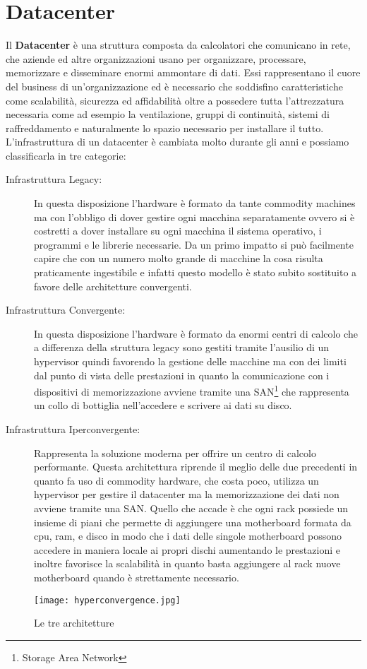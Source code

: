 \section{Datacenter}
Il \textbf{Datacenter} è una struttura composta da calcolatori che comunicano in rete, che aziende ed altre organizzazioni usano per organizzare, processare, memorizzare e disseminare enormi ammontare di dati. Essi rappresentano il cuore del business di un'organizzazione ed è necessario che soddisfino caratteristiche come scalabilità, sicurezza ed affidabilità oltre a possedere tutta l'attrezzatura necessaria come ad esempio la ventilazione, gruppi di continuità, sistemi di raffreddamento e naturalmente lo spazio necessario per installare il tutto. L'infrastruttura di un datacenter è cambiata molto durante gli anni e possiamo classificarla in tre categorie: 
\begin{description}
  \item[Infrastruttura Legacy:] In questa disposizione l'hardware è formato da tante commodity machines ma con l'obbligo di dover gestire ogni macchina separatamente ovvero si è costretti a dover installare su ogni macchina il sistema operativo, i programmi e le librerie necessarie. Da un primo impatto si può facilmente capire che con un numero molto grande di macchine la cosa risulta praticamente ingestibile e infatti questo modello è stato subito sostituito a favore delle architetture convergenti.
  \item[Infrastruttura Convergente:] In questa disposizione l'hardware è formato da enormi centri di calcolo che a differenza della struttura legacy sono gestiti tramite l'ausilio di un hypervisor quindi favorendo la gestione delle macchine ma con dei limiti dal punto di vista delle prestazioni in quanto la comunicazione con i dispositivi di memorizzazione avviene tramite una SAN\footnote{Storage Area Network} che rappresenta un collo di bottiglia nell'accedere e scrivere ai dati su disco.
  \item[Infrastruttura Iperconvergente:] Rappresenta la soluzione moderna per offrire un centro di calcolo performante. Questa architettura riprende il meglio delle due precedenti in quanto fa uso di commodity hardware, che costa poco, utilizza un hypervisor per gestire il datacenter ma la memorizzazione dei dati non avviene tramite una SAN. Quello che accade è che ogni rack possiede un insieme di piani che permette di aggiungere una motherboard formata da cpu, ram, e disco in modo che i dati delle singole motherboard possono accedere in maniera locale ai propri dischi aumentando le prestazioni e inoltre favorisce la scalabilità in quanto basta aggiungere al rack nuove motherboard quando è strettamente necessario.  
\end{description}
\begin{figure}[ht]
  \begin{center}
    \texttt{[image: hyperconvergence.jpg]}
    \caption{Le tre architetture}
    \label{hyp}
  \end{center}
\end{figure}
